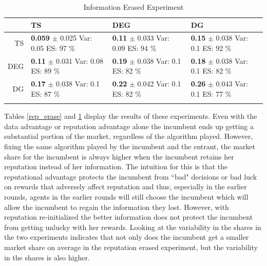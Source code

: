 \documentclass{article}
\theoremstyle{definition}
\begin{document}
\begin{table}[ht]
\centering
\caption{Information Erased Experiment} 
\begin{tabular}{rlll}
  \hline
 & TS & DEG &  DG \\ 
  \hline
TS & \makecell{ \textbf{ 0.059 } $\pm$ 0.025 \\Var:  0.05 \\ ES: 97 \% } & \makecell{ \textbf{ 0.11 } $\pm$ 0.033 \\Var:  0.09 \\ ES: 94 \% } & \makecell{ \textbf{ 0.15 } $\pm$ 0.038 \\Var:  0.1 \\ ES: 92 \% } \\ 
  DEG & \makecell{ \textbf{ 0.11 } $\pm$ 0.031 \\Var:  0.08 \\ ES: 89 \% } & \makecell{ \textbf{ 0.19 } $\pm$ 0.038 \\Var:  0.1 \\ ES: 82 \% } & \makecell{ \textbf{ 0.18 } $\pm$ 0.038 \\Var:  0.1 \\ ES: 82 \% } \\ 
   DG & \makecell{ \textbf{ 0.17 } $\pm$ 0.038 \\Var:  0.1 \\ ES: 87 \% } & \makecell{ \textbf{ 0.22 } $\pm$ 0.042 \\Var:  0.1 \\ ES: 82 \% } & \makecell{ \textbf{ 0.26 } $\pm$ 0.043 \\Var:  0.1 \\ ES: 77 \% } \\ 
   \hline
   \label{info_erase}
\end{tabular}
\end{table}

Tables \ref{rep_erase} and \ref{info_erase} display the results of these experiments. Even with the data advantage or reputation advantage alone the incumbent ends up getting a substantial portion of the market, regardless of the algorithm played. However, fixing the same algorithm played by the incumbent and the entrant, the market share for the incumbent is always higher when the incumbent retains her reputation instead of her information. The intuition for this is that the reputational advantage protects the incumbent from ``bad" decisions or bad luck on rewards that adversely affect reputation and thus, especially in the earlier rounds, agents in the earlier rounds will still choose the incumbent which will allow the incumbent to regain the information they lost. However, with reputation re-initialized the better information does not protect the incumbent from getting unlucky with her rewards. Looking at the variability in the shares in the two experiments indicates that not only does the incumbent get a smaller market share on average in the reputation erased experiment, but the variability in the shares is also higher.
\end{document}
